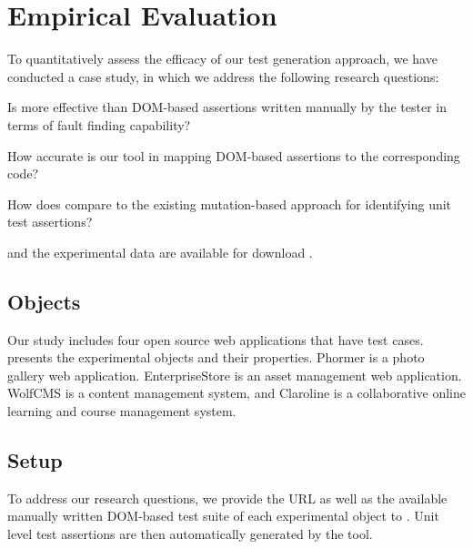 \section{Empirical Evaluation} \label{Sec:evaluation}
To quantitatively assess the efficacy of our test generation approach, we have conducted a case study, in which we address the following research questions:

\begin{description}[noitemsep]
\item [RQ1] Is \tool more effective than DOM-based assertions written manually by the tester in terms of fault finding capability?
\item [RQ2] How accurate is our tool in mapping DOM-based assertions to the corresponding \javascript code?
\item [RQ3] How does \tool compare to the existing mutation-based approach for identifying unit test assertions?
\end{description}

\tool and the experimental data are available for download \cite{atrina-dl}.
\subsection{Objects}
Our study includes four open source \javascript web applications that have \selenium test cases.  presents the experimental objects and their properties. Phormer \cite{phormer} is a photo gallery web application. EnterpriseStore \cite{enterpriseStore} is an asset management web application. WolfCMS \cite{wolfcms} is a content management system, and Claroline \cite{claroline} is a collaborative online learning and course management system. 

\subsection{Setup} \label{Sec:setup}
To address our research questions, we provide the URL as well as the available manually written DOM-based test suite of each experimental object to \tool. Unit level test assertions are then automatically generated by the tool.

